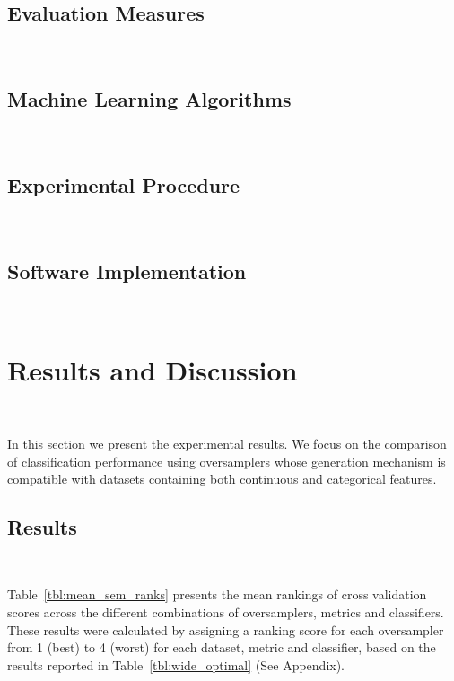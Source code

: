 \documentclass[parskip=full]{scrartcl}
\begin{document}


\subsection{Evaluation Measures}~\label{sec:evaluation_measures}

\subsection{Machine Learning Algorithms}~\label{sec:ml_algorithms}

\subsection{Experimental Procedure}~\label{sec:experimental_procedure}

\subsection{Software Implementation}~\label{sec:software_implementation}

\section{Results and Discussion}~\label{sec:results_and_discussion}

In this section we present the experimental results. We focus on the
comparison of classification performance using oversamplers whose generation
mechanism is compatible with datasets containing both continuous and
categorical features.


\subsection{Results}~\label{sec:results}

Table~\ref{tbl:mean_sem_ranks} presents the mean rankings of cross validation
scores across the different combinations of oversamplers, metrics and
classifiers. These results were calculated by assigning a ranking score for
each oversampler from 1 (best) to 4 (worst) for each dataset, metric and
classifier, based on the results reported in Table~\ref{tbl:wide_optimal} (See
Appendix).
\end{document}
